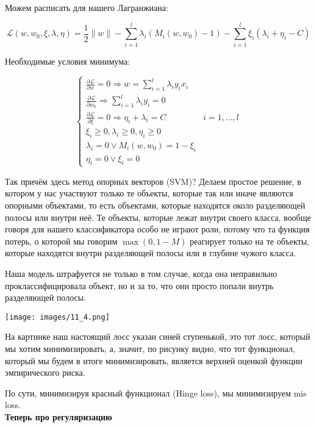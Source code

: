  Можем расписать для нашего Лагранжиана:

 $$\mathcal{L}(w, w_0, \xi, \lambda, \eta) = \frac{1}{2}\|w\| - \sum\limits_{i=1}^{l} \lambda_i (M_i(w, w_0) - 1) - \sum\limits_{i=1}^{l}\xi_i (\lambda_i + \eta_i - C)$$

 Необходимые условия минимума:

 $$\begin{cases}
   \frac{\partial \mathcal{L}}{\partial w} = 0 \Rightarrow w = \sum\limits_{i=1}^l \lambda_i y_i x_i\\
   \frac{\partial \mathcal{L}}{\partial w_0} \Rightarrow \sum\limits_{i=1}^l \lambda_i y_i = 0\\
   \frac{\partial \mathcal{L}}{\partial \xi} = 0 \Rightarrow \eta_i + \lambda_i = C & i = 1, \dots, l\\
   \xi_i \geqslant 0, \lambda_i \geqslant 0, \eta_i \geqslant 0\\
   \lambda_i = 0 \vee M_i(w, w_0) = 1 - \xi_i\\
   \eta_i = 0 \vee \xi_i = 0
 \end{cases}$$

Так причём здесь метод опорных векторов (SVM)?
Делаем простое решение, в котором у нас участвуют только те объекты, которые так или иначе являются опорными объектами, то есть объектами, которые находятся около разделяющей полосы или внутри неё. Те объекты, которые лежат внутри своего класса, вообще говоря для нашего классификатора особо не играют роли, потому что та функция потерь, о которой мы говорим $\max(0, 1-M)$ реагирует только на те объекты, которые находятся внутри разделяющей полосы или в глубине чужого класса. 

Наша модель штрафуется не только в том случае, когда она неправильно проклассифицировала объект, но и за то, что они просто попали внутрь разделяющей полосы. 

\begin{center}
    \texttt{[image: images/11\_4.png]}
\end{center}

На картинке  наш настоящий лосс указан синей ступенькой, это тот лосс, который мы хотим минимизировать, а, значит, по рисунку видно, что тот функционал, который мы будем в итоге минимизировать, является верхней оценкой функции эмпирического риска. 

По сути, минимизируя красный функционал (Hinge loss), мы минимизируем mis loss.\\


\textbf{Теперь про регуляризацию}\\

